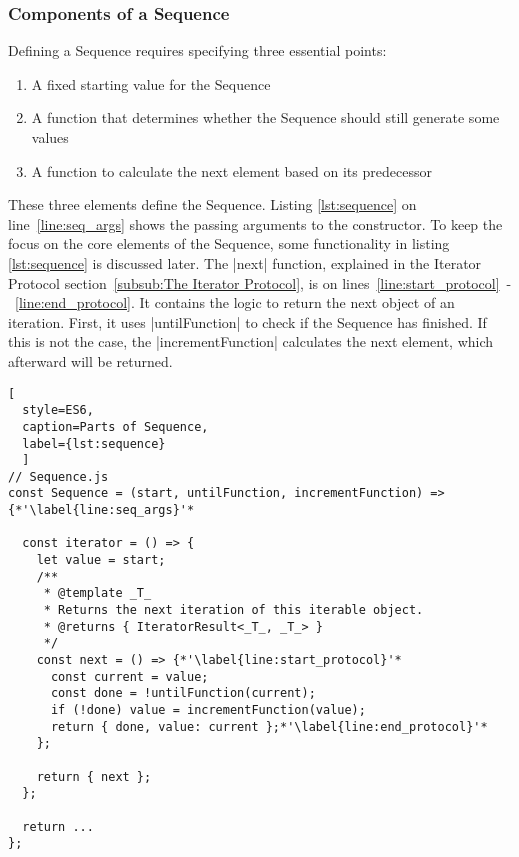 \subsubsection{Components of a Sequence}
\label{subsub:Components of a Sequence}
Defining a Sequence requires specifying three essential points:
\begin{enumerate}
  \item{A fixed starting value for the Sequence} 
  \item{A function that determines whether the Sequence should still generate
    some values} 
  \item{A function to calculate the next element based on its predecessor} 
\end{enumerate}
These three elements define the Sequence. Listing \ref{lst:sequence} on
line~\ref{line:seq_args} shows the passing arguments to the constructor.
To keep the focus on the core elements of the Sequence, some functionality in 
listing \ref{lst:sequence} is discussed later. The |next| function, explained in 
the Iterator Protocol section~\ref{subsub:The Iterator Protocol}, 
is on lines~\ref{line:start_protocol}~-~\ref{line:end_protocol}. It contains the 
logic to return the next object of an iteration. First, it uses |untilFunction| 
to check if the Sequence has finished. If this is not the case, the
|incrementFunction| calculates the next element, which afterward will be
returned.

\begin{lstlisting}[
  style=ES6, 
  caption=Parts of Sequence,
  label={lst:sequence}
  ]
// Sequence.js
const Sequence = (start, untilFunction, incrementFunction) => {*'\label{line:seq_args}'*

  const iterator = () => {
    let value = start;
    /**
     * @template _T_
     * Returns the next iteration of this iterable object.
     * @returns { IteratorResult<_T_, _T_> }
     */
    const next = () => {*'\label{line:start_protocol}'*
      const current = value;
      const done = !untilFunction(current);
      if (!done) value = incrementFunction(value);
      return { done, value: current };*'\label{line:end_protocol}'*
    };

    return { next };
  };

  return ... 
};
\end{lstlisting}


